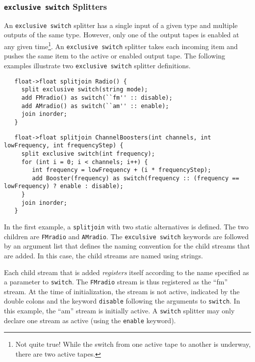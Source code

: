 \documentclass{tr}
\begin{document}
\subsubsection {\texttt{exclusive switch} Splitters}

An \texttt{exclusive  switch} splitter has  a single input of  a given
type and multiple  outputs of the same type. However,  only one of the
output  tapes is enabled  at any  given time\footnote{Not  quite true!
While the  switch from one active  tape to another  is underway, there
are two  active tapes.}.  An \texttt{exclusive  switch} splitter takes
each incoming item  and pushes the same item to  the active or enabled
output tape.  The  following examples illustrate two \texttt{exclusive
switch} splitter definitions.
\begin{verbatim}
   float->float splitjoin Radio() {
     split exclusive switch(string mode);
     add FMradio() as switch(``fm'' :: disable);
     add AMradio() as switch(``am'' :: enable);
     join inorder;
   }
\end{verbatim}

\begin{verbatim}
   float->float splitjoin ChannelBoosters(int channels, int lowFrequency, int frequencyStep) {
     split exclusive switch(int frequency);
     for (int i = 0; i < channels; i++) {
        int frequency = lowFrequency + (i * frequencyStep);
        add Booster(frequency) as switch(frequency :: (frequency == lowFrequency) ? enable : disable);
     }
     join inorder;
   }
\end{verbatim}

In the first example,  a \verb+splitjoin+ with two static alternatives
is    defined.    The   two    children    are   \verb+FMradio+    and
\verb+AMradio+. The \texttt{exculsive switch} keywords are followed by
an  argument list  that defines  the naming  convention for  the child
streams  that are added.  In this  case, the  child streams  are named
using strings.

Each child  stream that is  added {\it registers} itself  according to
the name specified as a parameter to \verb+switch+. The \verb+FMradio+
stream  is  thus registered  as  the ``fm''  stream.  At  the time  of
initialization,  the stream  is not  active, indicated  by  the double
colons  and  the keyword  \verb+disable+  following  the arguments  to
\verb+switch+.   In  this  example,  the ``am''  stream  is  initially
active. A \verb+switch+ splitter may only declare one stream as active
(using the \verb+enable+ keyword).
\end{document}
